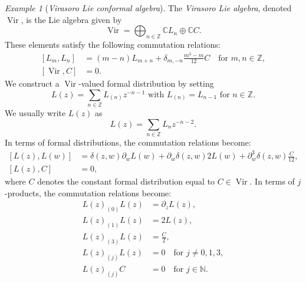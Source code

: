\documentclass[a4paper, 12pt, reqno]{amsart}
\theoremstyle{remark}
\newtheorem{example}[theorem]{Example}
\numberwithin{equation}{subsection}
\DeclareMathOperator{\Vir}{Vir}
\begin{document}
\begin{example}[\emph{Virasoro Lie conformal algebra}]
  \label{exa:1}
  The \emph{Virasoro Lie algebra}, denoted $\Vir$, is the Lie algebra given by
  \begin{equation*}
    \Vir = \bigoplus_{n \in \mathbb{Z}}\mathbb{C}L_{n} \oplus \mathbb{C}C.
  \end{equation*}
  These elements satisfy the following commutation relations:
  \begin{equation}
    \label{eq:6}
    \begin{split}
      [L_m, L_n] &= (m - n)L_{m + n} + \delta_{m, -n}\frac{m^3 - m}{12}C \quad \text{for }m, n \in \mathbb{Z}, \\
      [\Vir, C] &= 0.
    \end{split}
  \end{equation}
  We construct a $\Vir$-valued formal distribution by setting
  \begin{equation*}
    L(z) = \sum_{n \in \mathbb{Z}}L_{(n)}z^{-n - 1}\text{ with }L_{(n)} = L_{n - 1}\text{ for }n \in \mathbb{Z}.
  \end{equation*}
  We usually write $L(z)$ as
  \begin{equation*}
    L(z) = \sum_{n \in \mathbb{Z}}L_nz^{-n - 2}.
  \end{equation*}
  In terms of formal distributions, the commutation relations become:
  \begin{equation}
    \label{eq:7}
    \begin{split}
      [L(z), L(w)] &= \delta(z, w)\partial_wL(w) + \partial_w\delta(z, w)2L(w) + \partial^3_w\delta(z, w)\frac{C}{12}, \\
      [L(z), C] &= 0,
    \end{split}
  \end{equation}
  where $C$ denotes the constant formal distribution equal to $C \in \Vir$.
  In terms of $j$-products, the commutation relations become:
  \begin{equation}
    \label{eq:8}
    \begin{split}
      L(z)_{(0)}L(z) &= \partial_zL(z), \\
      L(z)_{(1)}L(z) &= 2L(z), \\
      L(z)_{(3)}L(z) &= \frac{C}{2}, \\
      L(z)_{(j)}L(z) &= 0 \quad \text{for }j \neq 0, 1, 3, \\
      L(z)_{(j)}C &= 0 \quad \text{for }j \in \mathbb{N}.
    \end{split}
\end{equation}

\end{example}
\end{document}
